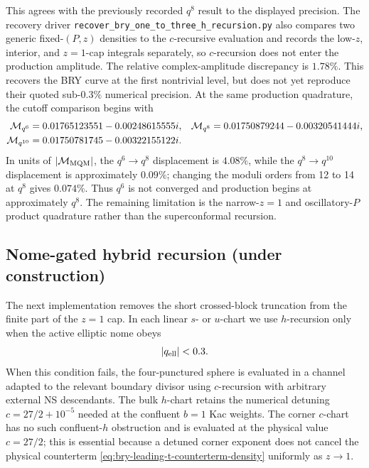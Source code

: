 \documentclass[11pt]{article}
\begin{document}
This agrees with the previously recorded $q^8$ result to the displayed
precision.  The recovery driver
\texttt{recover\_bry\_one\_to\_three\_h\_recursion.py} also compares two
generic fixed-$(P,z)$ densities to the $c$-recursive evaluation and records
the low-$z$, interior, and $z=1$-cap integrals separately, so $c$-recursion
does not enter the production amplitude.
The relative complex-amplitude discrepancy is $1.78\%$.  This recovers the
BRY curve at the first nontrivial level, but does not yet reproduce their
quoted sub-$0.3\%$ numerical precision.  At the same production quadrature,
the cutoff comparison begins with
\begin{align}
 \mathcal M_{q^6}&=0.01765123551-0.00248615555i,
 &
 \mathcal M_{q^8}&=0.01750879244-0.00320541444i,
 \notag\\
 \mathcal M_{q^{10}}&=0.01750781745-0.00322155122i.
 \label{eq:bry-first-regulated-q-ledger}
\end{align}
In units of $|\mathcal M_{\rm MQM}|$, the $q^6\to q^8$ displacement is
$4.08\%$, while the $q^8\to q^{10}$ displacement is approximately $0.09\%$;
changing the moduli orders from 12 to 14 at $q^8$ gives $0.074\%$.  Thus
$q^6$ is not converged and production begins at approximately $q^8$.  The
remaining limitation is the narrow-$z=1$ and oscillatory-$P$ product
quadrature rather than the superconformal recursion.

\subsection{Nome-gated hybrid recursion (under construction)}

The next implementation removes the short crossed-block truncation from the
finite part of the $z=1$ cap.  In each linear $s$- or $u$-chart we use
$h$-recursion only when the active elliptic nome obeys
\begin{equation}
 |q_{\rm ell}|<0.3.
 \label{eq:bry-hybrid-nome-gate}
\end{equation}
When this condition fails, the four-punctured sphere is evaluated in a
channel adapted to the relevant boundary divisor using $c$-recursion with
arbitrary external NS descendants.  The bulk $h$-chart retains the numerical
detuning $c=27/2+10^{-5}$ needed at the confluent $b=1$ Kac weights.  The
corner $c$-chart has no such confluent-$h$ obstruction and is evaluated at
the physical value $c=27/2$; this is essential because a detuned corner
exponent does not cancel the physical counterterm
\eqref{eq:bry-leading-t-counterterm-density} uniformly as $z\to1$.
\end{document}
